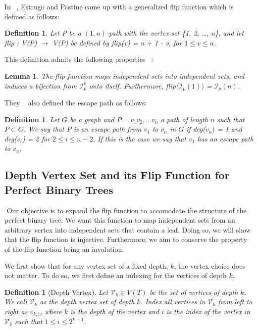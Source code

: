 \documentclass{amsart}
\newtheorem{lemma}[theorem]{Lemma}
\newtheorem{definition}[theorem]{Definition}
\theoremstyle{definition}
\begin{document}
In ~\cite{MR4245360}, Estrugo and Pastine came up with a generalized flip function which is defined as follows:

\begin{definition}
  Let P be a $(1,n)$-path with the vertex set \{1, 2, \ldots, n\}, and let flip : V(P) $\rightarrow$ V(P) be defined by flip(v) = n + 1 - v, for $1\leq v \leq n$.
\end{definition}

This definition admits the following properties ~\cite{MR4245360}:
\begin{lemma}
  The flip function maps independent sets into independent sets, and induces a bijection from $\mathcal{I}^k_p$ onto itself. Furthermore, flip($\mathcal{I}_p(1))$ = $\mathcal{I}_p(n)$.
\end{lemma}

They ~\cite{MR4245360} also defined the escape path as follows:

\begin{definition}
  Let $G$ be a graph and $P = v_1v_2, \ldots v_n$ a path of length $n$ such that $P \subset G$. We say that $P$ is an escape path from $v_1$ to $v_n$ in $G$ if deg($v_n)$ = 1 and deg($v_i$) = 2 for $2 \leq i \leq n-2$. If this is the case we say that $v_1$ has an escape path to $v_n$.
\end{definition}


\subsection{Depth Vertex Set and its Flip Function for Perfect Binary Trees}\label{Flip For Perfect Binary Trees}
$ $
Our objective is to expand the flip function to accomodate the structure of the perfect binary tree. We want this function to map independent sets from an arbitrary vertex into independent sets that contain a leaf. Doing so, we will show that the flip function is injective. Furthermore, we aim to conserve the property of the flip function being an involution.

We first show that for any vertex set of a fixed depth, $k$, the vertex choice does not matter. To do so, we first define an indexing for the vertices of depth $k$.

\begin{definition}[Depth Vertex]
  Let $\mathcal{V}_k \in V(T)$ be the set of vertices of depth $k$. We call $\mathcal{V}_k$ as the depth vertex set of depth $k$. Index all vertices in $\mathcal{V}_k$ from left to right as $v_{k, i}$, where $k$ is the depth of the vertex and $i$ is the index of the vertex in $\mathcal{V}_k$ such that $1 \leq i \leq 2^{k - 1}$.
\end{definition}
\end{document}
